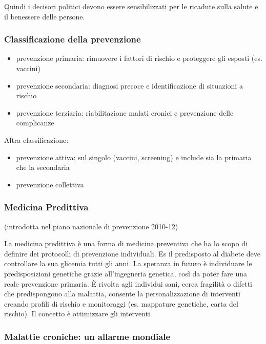 Quindi i decisori politici devono essere sensibilizzati per le ricadute
sulla salute e il benessere delle persone.

\subsubsection{Classificazione della prevenzione}

\begin{itemize}
\item
  prevenzione primaria: rimuovere i fattori di rischio e proteggere gli
  esposti (es. vaccini)
\item
  prevenzione secondaria: diagnosi precoce e identificazione di
  situazioni a rischio
\item
  prevenzione terziaria: riabilitazione malati cronici e prevenzione
  delle complicanze
\end{itemize}

Altra classificazione:

\begin{itemize}
\item
  prevenzione attiva: sul singolo (vaccini, screening) e include sia la
  primaria che la secondaria
\item
  prevenzione collettiva
\end{itemize}

\subsubsection{Medicina Predittiva} (introdotta nel piano
nazionale di prevenzione 2010-12)

La medicina predittiva è una forma di medicina preventiva che ha lo
scopo di definire dei protocolli di prevenzione individuali. Es il
predisposto al diabete deve controllare la sua glicemia tutti gli anni.
La speranza in futuro è individuare le predisposizioni genetiche grazie
all'ingegneria genetica, così da poter fare una reale prevenzione
primaria. È rivolta agli individui sani, cerca fragilità o difetti che
predispongono alla malattia, consente la personalizzazione di interventi
creando profili di rischio e monitoraggi (es. mappature genetiche, carta
del rischio). Il concetto è ottimizzare gli interventi.

\subsubsection{Malattie croniche: un allarme mondiale}

